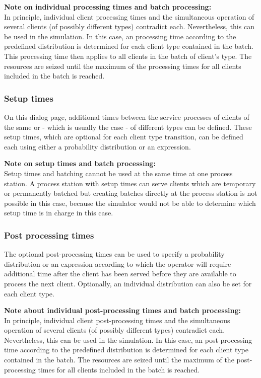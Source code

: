 \textbf{Note on individual processing times and batch processing:}~\\
In principle, individual client processing times and the simultaneous operation of several clients
(of possibly different types) contradict each. Nevertheless, this can be used in the simulation.
In this case, an processing time according to the predefined distribution is determined for each
client type contained in the batch. This processing time then applies to all clients in the batch
of client's type. The resources are seized until the maximum of the processing times for all
clients included in the batch is reached.

\subsubsection*{Setup times}

On this dialog page, additional times between the service processes of clients of the same
or - which is usually the case - of different types can be defined. These setup times,
which are optional for each client type transition, can be defined each using either a
probability distribution or an expression.

\textbf{Note on setup times and batch processing:}~\\
Setup times and batching cannot be used at the same time at one process station.
A process station with setup times can serve clients which are temporary or
permanently batched but creating batches directly at the process station is
not possible in this case, because the simulator would not be able to determine
which setup time is in charge in this case.

\subsubsection*{Post processing times}

The optional post-processing times can be used to specify a probability distribution or an expression
according to which the operator will require additional time after the client has been served before they are
available to process the next client. Optionally, an individual distribution can also be set
for each client type.

\textbf{Note about individual post-processing times and batch processing:}~\\
In principle, individual client post-processing times and the simultaneous operation of several clients
(of possibly different types) contradict each. Nevertheless, this can be used in the simulation.
In this case, an post-processing time according to the predefined distribution is determined for each
client type contained in the batch. The resources are seized until the maximum of the post-processing times
for all clients included in the batch is reached.

